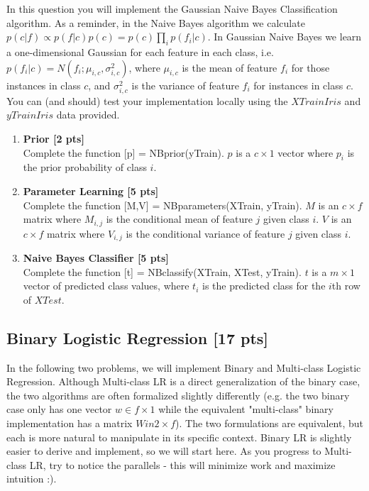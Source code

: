 In this question you will implement the Gaussian Naive Bayes Classification algorithm. As a reminder, in the Naive Bayes algorithm we calculate $p(c|f) \propto p(f|c)p(c) = p(c) \prod_i p(f_i|c)$. In Gaussian Naive Bayes we learn a one-dimensional Gaussian for each feature in each class, i.e. $p(f_i|c) = N(f_i; \mu_{i,c},\sigma^2_{i,c})$, where $\mu_{i,c}$ is the mean of feature $f_i$ for those instances in class $c$, and $\sigma^2_{i,c}$ is the variance of feature $f_i$ for instances in class $c$. You can (and should) test your implementation locally using the $\mathit{XTrainIris}$ and $\mathit{yTrainIris}$ data provided.
\begin{enumerate}
\item \textbf{Prior [2 pts]}\\
Complete the function \textsf{[p] = NBprior(yTrain)}. $p$ is a $c \times 1$ vector where $p_i$ is the prior probability of class $i$.
\item \textbf{Parameter Learning [5 pts]}\\
Complete the function \textsf{[M,V] = NBparameters(XTrain, yTrain)}. $M$ is an $c \times f$ matrix where $M_{i,j}$ is the conditional mean of feature $j$ given class $i$. $V$ is an $c \times f$ matrix where $V_{i,j}$ is the conditional variance of feature $j$ given class $i$.
\item \textbf{Naive Bayes Classifier [5 pts]}\\
Complete the function \textsf{[t] = NBclassify(XTrain, XTest, yTrain)}. $t$ is a $m \times 1$ vector of predicted class values, where $t_i$ is the predicted class for the $i$th row of $\mathit{XTest}$.
\end{enumerate}

\subsection*{Binary Logistic Regression [17 pts]}

In the following two problems, we will implement Binary and Multi-class Logistic Regression. Although Multi-class LR is a direct generalization of the binary case, the two algorithms are often formalized slightly differently (e.g. the two binary case only has one vector $w \in f \times 1$ while the equivalent "multi-class" binary implementation has a matrix $W in 2 \times f$). The two formulations are equivalent, but each is more natural to manipulate in its specific context. Binary LR is slightly easier to derive and implement, so we will start here. As you progress to Multi-class LR, try to notice the parallels - this will minimize work and maximize intuition :).

